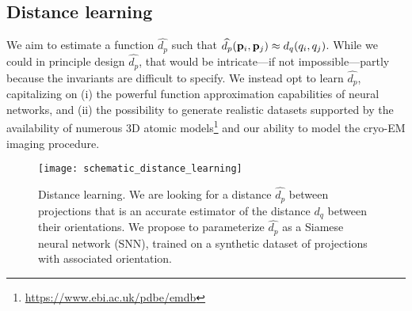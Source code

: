 \subsection{Distance learning}\label{sec:method:distance-learning}


We aim to estimate a function $\widehat{d_p}$ such that $\widehat{d_p}(\mathbf{p}_i, \mathbf{p}_j) \approx d_q(q_i, q_j)$.
While we could in principle design $\widehat{d_p}$, that would be intricate---if not impossible---partly because the invariants are difficult to specify.
We instead opt to learn $\widehat{d_p}$, capitalizing on (i) the powerful function approximation capabilities of neural networks, and (ii) the possibility to generate realistic datasets supported by the availability of numerous 3D atomic models\footnote{\url{https://www.ebi.ac.uk/pdbe/emdb}} and our ability to model the cryo-EM imaging procedure.

\begin{figure}
    \centering
    \texttt{[image: schematic\_distance\_learning]}
    \caption{%
        Distance learning.
        We are looking for a distance $\widehat{d_p}$ between projections that is an accurate estimator of the distance $d_q$ between their orientations.
        We propose to parameterize $\widehat{d_p}$ as a Siamese neural network (SNN), trained on a synthetic dataset of projections with associated orientation.
}\label{fig:schematic:distance-learning}
\end{figure}

